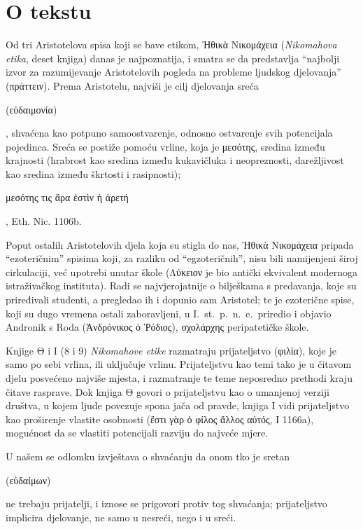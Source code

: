 


\section*{O tekstu}

Od tri Aristotelova spisa koji se bave etikom, Ἠθικὰ Νικομάχεια (\textit{Nikomahova etika}, deset knjiga) danas je najpoznatija, i smatra se da predstavlja ``najbolji izvor za razumijevanje Aristotelovih pogleda na probleme ljudskog djelovanja'' (πράττειν). Prema Aristotelu, najviši je cilj djelovanja sreća \begin{greek}(εὐδαιμονία)\end{greek}, shvaćena kao potpuno samoostvarenje, odnosno ostvarenje svih potencijala pojedinca. Sreća se postiže pomoću vrline, koja je μεσότης, sredina između krajnosti (hrabrost kao sredina između kukavičluka i neopreznosti, darežljivost kao sredina između škrtosti i rasipnosti); \begin{greek}μεσότης τις ἄρα ἐστὶν ἡ ἀρετή\end{greek}, Eth. Nic. 1106b.

Poput ostalih Aristotelovih djela koja su stigla do nas, Ἠθικὰ Νικομάχεια pripada ``ezoteričnim'' spisima koji, za razliku od ``egzoteričnih'', nisu bili namijenjeni široj cirkulaciji, već upotrebi unutar škole (Λύκειον je bio antički ekvivalent modernoga istraživačkog instituta). Radi se najvjerojatnije o bilješkama s predavanja, koje su priređivali studenti, a pregledao ih i dopunio sam Aristotel; te je ezoterične spise, koji su dugo vremena ostali zaboravljeni, u I.~st.\ p.~n.~e.\ priredio i objavio Andronik s Roda (Ἀνδρόνικος ὁ Ῥόδιος), σχολάρχης peripatetičke škole.

Knjige Θ i Ι (8 i 9) \textit{Nikomahove etike} razmatraju prijateljstvo (φιλία), koje je samo po sebi vrlina, ili uključuje vrlinu. Prijateljstvu kao temi tako je u čitavom djelu posvećeno najviše mjesta, i razmatranje te teme neposredno prethodi kraju čitave rasprave. Dok knjiga Θ govori o prijateljstvu kao o umanjenoj verziji društva, u kojem ljude povezuje spona jača od pravde, knjiga Ι vidi prijateljstvo kao proširenje vlastite osobnosti (ἔστι γὰρ ὁ φίλος ἄλλος αὐτός, Ι 1166a), mogućnost da se vlastiti potencijali razviju do najveće mjere.

U našem se odlomku izvještava o shvaćanju da onom tko je sretan \begin{greek}(εὐδαίμων)\end{greek} ne trebaju prijatelji, i iznose se prigovori protiv tog shvaćanja; prijateljstvo implicira djelovanje, ne samo u nesreći, nego i u sreći.

